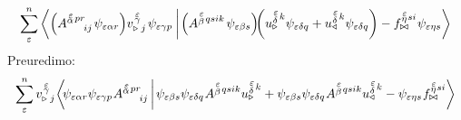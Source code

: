 \begin{equation*}
   \sum^n_\varepsilon
   \braket{
      \qty( A^{\substack{\mkern2mu \varepsilon \\[-0.65mm] \alpha} \mkern2mu p r}_{\mkern29mu i j} \mkern2mu
      \psi_{ \varepsilon \alpha r} )
      v^{\mkern 2mu \substack{\varepsilon \\[-0.65mm] \gamma \\[-0.2mm]}}_{\triangleright \mkern5mu j} \mkern2mu
      \psi_{\varepsilon \gamma p} \mkern4mu}
   {
      \mkern2mu \qty( A^{\substack{\mkern2mu \varepsilon \\[0.05mm] \beta} \mkern2mu q s i k} \mkern2mu
      \psi_{\varepsilon \beta s} ) \mkern-4mu 
      \qty( u^{\substack{\mkern2mu \varepsilon \\[0.10mm] \delta} \mkern2mu k}_\triangleright
      \psi_{\varepsilon \delta q}
      +
      u^{\substack{\mkern2mu \varepsilon \\[0.10mm] \delta} \mkern2mu k}_\triangleleft
      \psi_{\varepsilon \delta q} )
      -
      f^{\substack{\mkern2mu \varepsilon \\[-0.59mm] \eta} \mkern1mu s i}_{\bowtie} \mkern1mu
      \psi_{\varepsilon \eta s} }
\end{equation*}
Preuredimo:
\begin{equation*}
   \sum^n_\varepsilon
   v^{\mkern 2mu \substack{\varepsilon \\[-0.65mm] \gamma \\[-0.2mm]}}_{\triangleright \mkern5mu j} \mkern-2mu
   \braket{
      \mkern-4mu \psi_{ \varepsilon \alpha r}
      \psi_{\varepsilon \gamma p} \mkern1mu
      A^{\substack{\mkern2mu \varepsilon \\[-0.65mm] \alpha} \mkern2mu p r}_{\mkern29mu i j}  \mkern3mu }
   {
      \mkern2mu \psi_{\varepsilon \beta s}
      \psi_{\varepsilon \delta q} \mkern1mu
      A^{\substack{\mkern2mu \varepsilon \\[0.05mm] \beta} \mkern2mu q s i k}
      u^{\substack{\mkern2mu \varepsilon \\[0.09mm] \delta} \mkern2mu k}_\triangleright
      +
      \psi_{\varepsilon \beta s}
      \psi_{\varepsilon \delta q} \mkern1mu
      A^{\substack{\mkern2mu \varepsilon \\[0.05mm] \beta} \mkern2mu q s i k}
      u^{\substack{\mkern2mu \varepsilon \\[0.09mm] \delta} \mkern2mu k}_\triangleleft
      -
      \psi_{\varepsilon \eta s} \mkern1mu
      f^{\substack{\mkern2mu \varepsilon \\[-0.59mm] \eta} \mkern1mu s i}_{\bowtie} }
\end{equation*}
